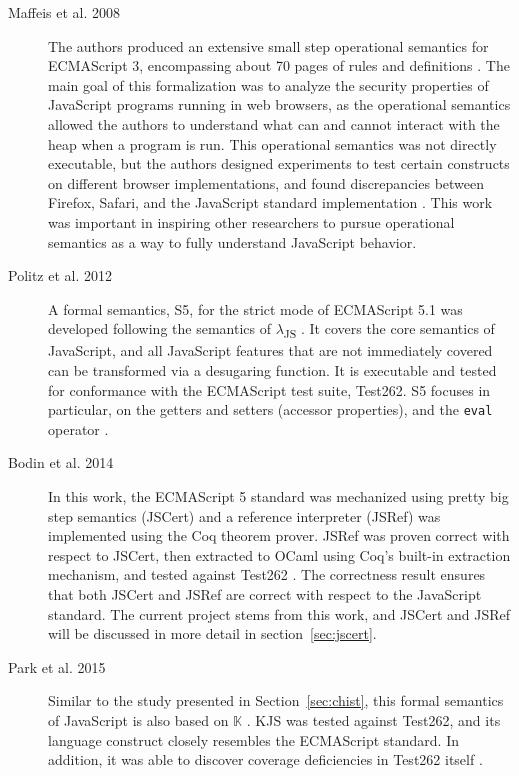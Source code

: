 \documentclass[a4paper,11pt,twoside]{report}
\begin{document}
\begin{description}
\item[Maffeis et al. 2008] The authors produced an extensive small step operational semantics for ECMAScript 3, encompassing about 70 pages of rules and definitions \cite{Maffeis:2008}. The main goal of this formalization was to analyze the security properties of JavaScript programs running in web browsers, as the operational semantics allowed the authors to understand what can and cannot interact with the heap when a program is run. This operational semantics was not directly executable, but the authors designed experiments to test certain constructs on different browser implementations, and found discrepancies between Firefox, Safari, and the JavaScript standard implementation \cite{Maffeis:2008}. This work was important in inspiring other researchers to pursue operational semantics as a way to fully understand JavaScript behavior.

\item[Politz et al. 2012] A formal semantics, S5, for the strict mode of ECMAScript 5.1 was developed following the semantics of $\lambda$\textsubscript{JS} \cite{Guha:2010}. It covers the core semantics of JavaScript, and all JavaScript features that are not immediately covered can be transformed via a desugaring function. It is executable and tested for conformance with the ECMAScript test suite, Test262. S5 focuses in particular, on the getters and setters (accessor properties), and the \texttt{eval} operator \cite{Politz:2012}.

\item[Bodin et al. 2014] In this work, the ECMAScript 5 standard was mechanized using pretty big step semantics (JSCert) and a reference interpreter (JSRef) was implemented using the Coq theorem prover. JSRef was proven correct with respect to JSCert, then extracted to OCaml using Coq's built-in extraction mechanism, and tested against Test262 \cite{Bodin:2014}. The correctness result ensures that both JSCert and JSRef are correct with respect to the JavaScript standard. The current project stems from this work, and JSCert and JSRef will be discussed in more detail in section~\ref{sec:jscert}.

\item[Park et al. 2015] Similar to the study presented in Section~\ref{sec:chist}, this formal semantics of JavaScript is also based on $\mathbb{K}$ \cite{k-primer-2013-v32}. KJS was tested against Test262, and its language construct closely resembles the ECMAScript standard. In addition, it was able to discover coverage deficiencies in Test262 itself \cite{Park:2015}.
\end{description}
\end{document}
